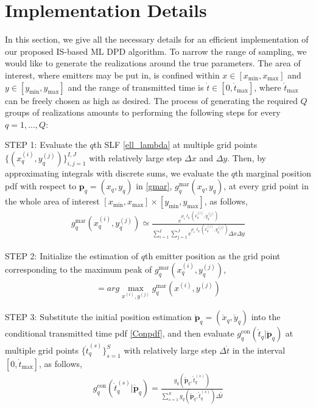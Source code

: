 \documentclass[review]{elsarticle}
\begin{document}
\section{Implementation Details}
In this section, we give all the necessary details for an efficient implementation of our proposed IS-based ML DPD algorithm. To narrow the range of sampling, we would like to generate the realizations around the true parameters. The area of interest, where emitters may be put in, is confined within $x\in [x_{\text{min}},x_{\text{max}}]$ and $y\in [y_{\text{min}},y_{\text{max}}]$ and the range of transmitted time is $\mathring{t}\in [0,\mathring{t}_{\text{max}}]$, where $\mathring{t}_{\text{max}}$ can be freely chosen as high as desired. The process of generating the required $Q$ groups of realizations amounts to performing the following steps for every $q=1,...,Q$: 

STEP 1: Evaluate the $q$th SLF \eqref{ell_lambda} at multiple grid points $\lbrace(x_q^{(i)},y_q^{(j)})\rbrace_{i,j=1}^{I,J}$ with relatively large step $\Delta x$ and $\Delta y$. Then, by approximating integrals with discrete sums, we evaluate the $q$th marginal position pdf with respect to $\boldsymbol{p}_q=(x_q,y_q)$ in \eqref{gmar}, $g_{q}^{\text{mar}}(x_q,y_q)$, at every grid point in the whole area of interest $[x_{\text{min}},x_{\text{max}}]\times [y_{\text{min}},y_{\text{max}}]$, as follows, 
\begin{align}
    g_{q}^{\text{mar}}(x_q^{(i)},y_q^{(j)})\simeq\frac{e^{\rho_1\ell_q (x_q^{(i)},y_q^{(j)})}}{\sum_{i=1}^I\sum_{j=1}^J e^{\rho_1\ell_q (x_q^{(i)},y_q^{(j)})}\Delta x\Delta y}
\end{align}

STEP 2: Initialize the estimation of $q$th emitter position as the grid point corresponding to the maximum peak of $g_{q}^{\text{mar}}(x_q^{(i)},y_q^{(j)})$,
\begin{align}
    [\mathring{x}_q,\mathring{y}_q]=arg \max_{x^{(i)},y^{(j)}} g_{q}^{\text{mar}}(x^{(i)},y^{(j)})
\end{align}

STEP 3: Substitute the initial position estimation $\mathring{\boldsymbol{p}}_q=(\mathring{x}_q,\mathring{y}_q)$ into the conditional transmitted time pdf \eqref{Conpdf}, and then evaluate $g_{q}^{\text{con}}(\mathring{t}_q\vert \mathring{\boldsymbol{p}}_q)$ at multiple grid points $\lbrace \mathring{t}_q^{(s)} \rbrace_{s=1}^{S}$ with relatively large step $\Delta \mathring{t}$ in the interval $[0,\mathring{t}_{\text{max}}]$, as follows,
\begin{align}
    g_{q}^{\text{con}}(\mathring{t}_q^{(s)} \vert \mathring{\boldsymbol{p}}_q)=\frac{g_q(\mathring{\boldsymbol{p}}_q,\mathring{t}_q^{(s)})}{\sum_{s=1}^S g_q(\mathring{\boldsymbol{p}}_q,\mathring{t}_q^{(s)})\Delta\mathring{t}}
\end{align}
\end{document}
